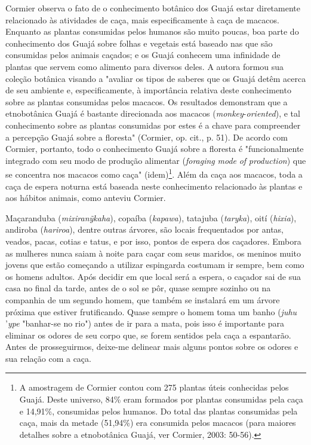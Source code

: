 Cormier observa o fato de o conhecimento botânico dos Guajá estar
diretamente relacionado às atividades de caça, mais especificamente à
caça de macacos. Enquanto as plantas consumidas pelos humanos são muito
poucas, boa parte do conhecimento dos Guajá sobre folhas e vegetais está
baseado nas que são consumidas pelos animais caçados; e os Guajá
conhecem uma infinidade de plantas que servem como alimento para
diversos deles. A autora formou sua coleção botânica visando a "avaliar
os tipos de saberes que os Guajá detêm acerca de seu ambiente e,
especificamente, à importância relativa deste conhecimento sobre as
plantas consumidas pelos macacos. Os resultados demonstram que a
etnobotânica Guajá é bastante direcionada aos macacos
(\emph{monkey}-\emph{oriented}), e tal conhecimento sobre as plantas
consumidas por estes é a chave para compreender a percepção Guajá sobre
a floresta" (Cormier, op. cit., p. 51). De acordo com Cormier, portanto,
todo o conhecimento Guajá sobre a floresta é "funcionalmente integrado
com seu modo de produção alimentar (\emph{foraging} \emph{mode}
\emph{of} \emph{production}) que se concentra nos macacos como caça"
(idem)\footnote{A amostragem de Cormier contou com 275 plantas úteis
  conhecidas pelos Guajá. Deste universo, 84\% eram formados por plantas
  consumidas pela caça e 14,91\%, consumidas pelos humanos. Do total das
  plantas consumidas pela caça, mais da metade (51,94\%) era consumida
  pelos macacos (para maiores detalhes sobre a etnobotânica Guajá, ver
  Cormier, 2003: 50-56).}. Além da caça aos macacos, toda a caça de
espera noturna está baseada neste conhecimento relacionado às plantas e
aos hábitos animais, como anteviu Cormier.

Maçaranduba (\emph{mixiranỹkaha}), copaíba (\emph{kapawa}), tatajuba
(\emph{taryka}), oití (\emph{hixia}), andiroba (\emph{hariroa}), dentre
outras árvores, são locais frequentados por antas, veados, pacas, cotias
e tatus, e por isso, pontos de espera dos caçadores. Embora as mulheres
nunca saiam à noite para caçar com seus maridos, os meninos muito jovens
que estão começando a utilizar espingarda costumam ir sempre, bem como
os homens adultos. Após decidir em que local será a espera, o caçador
sai de sua casa no final da tarde, antes de o sol se pôr, quase sempre
sozinho ou na companhia de um segundo homem, que também se instalará em
um árvore próxima que estiver frutificando. Quase sempre o homem toma um
banho (\emph{juhu} '\emph{ype} "banhar-se no rio") antes de ir para a
mata, pois isso é importante para eliminar os odores de seu corpo que,
se forem sentidos pela caça a espantarão. Antes de prosseguirmos,
deixe-me delinear mais alguns pontos sobre os odores e sua relação com a
caça.

